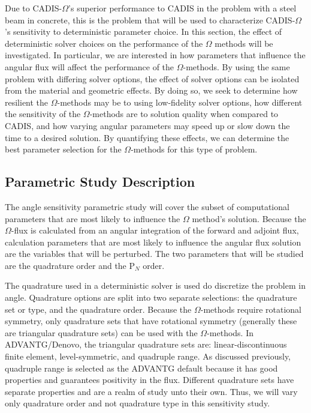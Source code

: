 Due to CADIS-$\Omega$'s superior performance to CADIS
in the problem with a steel beam in concrete, this is the problem that will be
used to characterize CADIS-$\Omega$'s sensitivity to deterministic
parameter choice.
In this section, the effect of deterministic solver choices on the
performance of the $\Omega$ methods will be investigated. In particular, we are
interested in how parameters that influence the angular flux will affect the
performance of the $\Omega$-methods. By using the same problem
with differing solver options, the effect of solver options can be isolated from
the material and geometric effects. By doing so, we seek to determine how
resilient the $\Omega$-methods may be to using low-fidelity solver options, how
different the sensitivity of the $\Omega$-methods are to solution quality when
compared to CADIS, and how varying angular parameters may speed up or slow down
the time to a desired solution. By quantifying these effects, we can determine
the best parameter selection for the $\Omega$-methods for this type of problem.

\subsection{Parametric Study Description}
\label{subsec:parstudy}

The angle sensitivity parametric study will cover the subset of computational parameters
that are most likely to influence the $\Omega$ method's solution. Because the
$\Omega$-flux is calculated from an angular integration of the forward and adjoint
flux, calculation parameters that are most likely to influence the angular flux
solution are the variables that will be perturbed.
The two parameters that will be studied
are the quadrature order and the P$_N$ order.

The quadrature used in a deterministic solver is used do discretize the
problem in angle. Quadrature options are split into two separate selections: the
quadrature set or type, and the quadrature order. Because the $\Omega$-methods
require rotational symmetry, only quadrature sets that have rotational
symmetry (generally these are triangular quadrature sets)
can be used with the $\Omega$-methods. In ADVANTG/Denovo, the triangular
quadrature sets are: linear-discontinuous finite element, level-symmetric, and
quadruple range. As discussed previously, quadruple range is selected as the
ADVANTG default because it has good properties and guarantees positivity in the
flux. Different quadrature sets have separate
properties and are a realm of study unto their own. Thus, we will vary only
quadrature order and not quadrature type in this sensitivity study.

